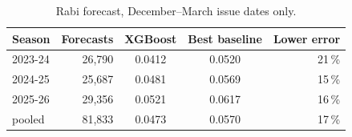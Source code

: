 \begin{table}[H]
\centering
\caption{Rabi forecast, December--March issue dates only.}
\label{tab:r_decmar}
\footnotesize
\begin{tabular}{@{}lrccr@{}}
\toprule
\textbf{Season} & \textbf{Forecasts} & \textbf{XGBoost} & \textbf{Best baseline} & \textbf{Lower error} \\
\midrule
2023-24 & 26,790 & 0.0412 & 0.0520 & 21\,\% \\
2024-25 & 25,687 & 0.0481 & 0.0569 & 15\,\% \\
2025-26 & 29,356 & 0.0521 & 0.0617 & 16\,\% \\
pooled & 81,833 & 0.0473 & 0.0570 & 17\,\% \\
\bottomrule
\end{tabular}
\end{table}
